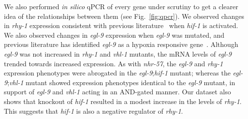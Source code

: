 \documentclass[9pt,twocolumn,twoside]{pnas-new}
\newcommand{\egl}{\emph{egl-9}}
\newcommand{\rhy}{\emph{rhy-1}}
\newcommand{\vhl}{\emph{vhl-1}}
\newcommand{\hif}{\emph{hif-1}}
\newcommand{\nhr}{\emph{nhr-57}}
\newcommand{\hifp}{HIF-1}
\begin{document}
We also performed \emph{in silico} qPCR of every gene under scrutiny to get a clearer idea of the relationships between them (see Fig.~\ref{fig:qpcr}). We observed changes in \rhy{} expression consistent with previous literature~\cite{} when \hif{} is activated. We also observed changes in \egl{} expression when \egl{} was mutated, and previous literature has identified \egl{} as a hypoxia responsive gene~\cite{}. Although \egl{} was not increased in \rhy{} and \vhl{} mutants, the mRNA levels of \egl{} trended towards increased expression.
As with \nhr{}, the \egl{} and \rhy{} expression phenotypes were abrogated in the \egl{};\hif{} mutant; whereas the \egl{};\vhl{} mutant showed expression phenotypes identical to the \egl{} mutant, in support of \egl{} and \vhl{} acting in an AND-gated manner.
Our dataset also shows that knockout of \hif{} resulted in a modest increase in the levels of \rhy{}. This suggests that \hif{} is also a negative regulator of \rhy{}.

\end{document}
